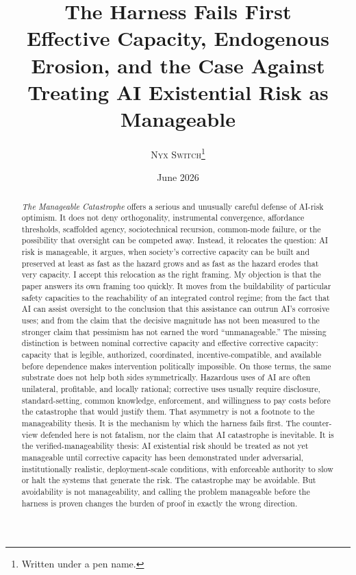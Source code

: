 \documentclass[11pt]{article}
\title{\textbf{The Harness Fails First}\\[0.3em]
\large Effective Capacity, Endogenous Erosion, and the Case Against Treating AI Existential Risk as Manageable}
\author{\textsc{Nyx Switch}\thanks{Written under a pen name.}}
\date{June 2026}
\begin{document}
\maketitle

\begin{abstract}
\noindent \textit{The Manageable Catastrophe} offers a serious and unusually careful defense of AI-risk optimism. It does not deny orthogonality, instrumental convergence, affordance thresholds, scaffolded agency, sociotechnical recursion, common-mode failure, or the possibility that oversight can be competed away. Instead, it relocates the question: AI risk is manageable, it argues, when society's corrective capacity can be built and preserved at least as fast as the hazard grows and as fast as the hazard erodes that very capacity. I accept this relocation as the right framing. My objection is that the paper answers its own framing too quickly. It moves from the buildability of particular safety capacities to the reachability of an integrated control regime; from the fact that AI can assist oversight to the conclusion that this assistance can outrun AI's corrosive uses; and from the claim that the decisive magnitude has not been measured to the stronger claim that pessimism has not earned the word ``unmanageable.'' The missing distinction is between nominal corrective capacity and effective corrective capacity: capacity that is legible, authorized, coordinated, incentive-compatible, and available before dependence makes intervention politically impossible. On those terms, the same substrate does not help both sides symmetrically. Hazardous uses of AI are often unilateral, profitable, and locally rational; corrective uses usually require disclosure, standard-setting, common knowledge, enforcement, and willingness to pay costs before the catastrophe that would justify them. That asymmetry is not a footnote to the manageability thesis. It is the mechanism by which the harness fails first. The counter-view defended here is not fatalism, nor the claim that AI catastrophe is inevitable. It is the verified-manageability thesis: AI existential risk should be treated as not yet manageable until corrective capacity has been demonstrated under adversarial, institutionally realistic, deployment-scale conditions, with enforceable authority to slow or halt the systems that generate the risk. The catastrophe may be avoidable. But avoidability is not manageability, and calling the problem manageable before the harness is proven changes the burden of proof in exactly the wrong direction.
\end{abstract}
\end{document}
